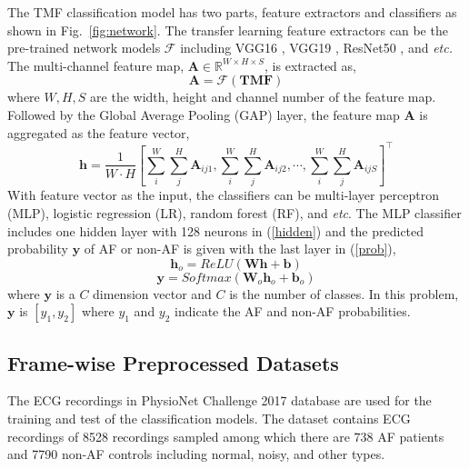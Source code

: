 \documentclass[journal]{IEEEtran}
\begin{document}
The TMF classification model has two parts, feature extractors and classifiers as shown in Fig.~\ref{fig:network}. The transfer learning feature extractors can be the pre-trained network models $\mathcal{F}$ including VGG16 \cite{vgg_2015}, VGG19 \cite{vgg_2015}, ResNet50 \cite{ResNet_2016}, and {\it etc.} The multi-channel feature map, $\mathbold{A} \in \mathbb{R}^{W\times H \times S}$, is extracted as,
\begin{equation}
  \mathbold{A} = \mathcal{F}(\mathbold{TMF})
\end{equation}
where $W, H, S$ are the width, height and channel number of the feature map. Followed by the Global Average Pooling (GAP) layer, the feature map $\mathbold{A}$ is aggregated as the feature vector,
\begin{equation}
  \mathbold{h} = \frac{1}{W\cdot H}[\sum_i^W\sum_j^H\mathbold{A}_{ij1}, \sum_i^W\sum_j^H\mathbold{A}_{ij2}, \cdots, \sum_i^W\sum_j^H\mathbold{A}_{ijS}]^\top
\end{equation}
With feature vector as the input, the classifiers can be multi-layer perceptron (MLP), logistic regression (LR), random forest (RF), and {\it etc}.
The MLP classifier includes one hidden layer with 128 neurons in (\ref{hidden}) and the predicted probability $\mathbold{y}$ of AF or non-AF is given with the last layer in (\ref{prob}),
\begin{equation}\label{hidden}
  \mathbold{h}_o = ReLU(\mathbold{W} \mathbold{h} + \mathbold{b})
\end{equation}
\begin{equation}\label{prob}
  \mathbold{y} = Softmax(\mathbold{W}_o \mathbold{h}_o + \mathbold{b}_o)
\end{equation}
where $\mathbold{y}$ is a $C$ dimension vector and $C$ is the number of classes. In this problem, $\mathbold{y}$ is $[y_1, y_2]$ where $y_1$ and $y_2$ indicate the AF and non-AF probabilities.


\subsection{Frame-wise Preprocessed Datasets}

The ECG recordings in PhysioNet Challenge 2017 database \cite{standard_database_2000,clifford_AF_2017} are used for the training and test of the classification models. The dataset contains ECG recordings of 8528 recordings sampled among which there are 738 AF patients and 7790 non-AF controls including normal, noisy, and other types. 
\end{document}
